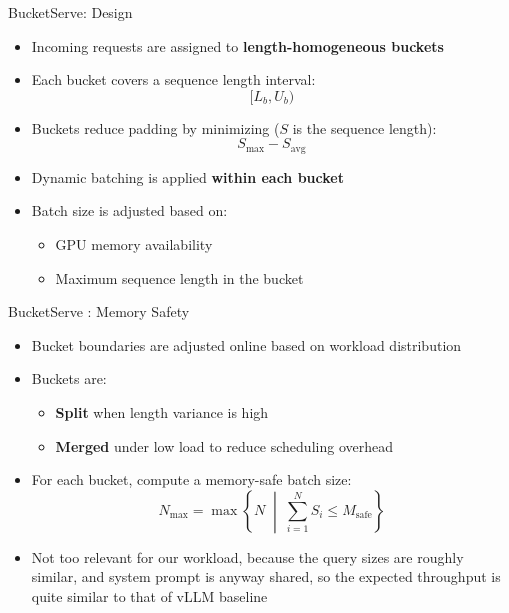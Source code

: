 \documentclass[Serif, 10pt, brown]{beamer}
\theoremstyle{example}
\theoremstyle{plain}
\begin{document}
\begin{frame}{BucketServe: Design}
    \begin{itemize}
        \item Incoming requests are assigned to \textbf{length-homogeneous buckets}
        \item Each bucket covers a sequence length interval:
        \[
            [L_b, U_b)
        \]
        \item Buckets reduce padding by minimizing ($S$ is the sequence length):
        \[
            S_{\max} - S_{\mathrm{avg}}
        \]
        \item Dynamic batching is applied \textbf{within each bucket}
        \item Batch size is adjusted based on:
        \begin{itemize}
            \item GPU memory availability
            \item Maximum sequence length in the bucket
        \end{itemize}
    \end{itemize}
\end{frame}
\begin{frame}{BucketServe : Memory Safety}
    \begin{itemize}
        \item Bucket boundaries are adjusted online based on workload distribution
        \item Buckets are:
        \begin{itemize}
            \item \textbf{Split} when length variance is high
            \item \textbf{Merged} under low load to reduce scheduling overhead
        \end{itemize}
        \item For each bucket, compute a memory-safe batch size:
        \[
            N_{\max} =
            \max \left\{
            N \;\middle|\;
            \sum_{i=1}^{N} S_i \le M_{\text{safe}}
            \right\}
        \]
        \item Not too relevant for our workload, because the query sizes are roughly similar, and system prompt is anyway shared, so the expected throughput is quite similar to that of vLLM baseline
    \end{itemize}
\end{frame}
\end{document}
